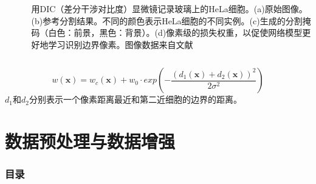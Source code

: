 \documentclass{beamer}%
\begin{document}
\begin{frame}
\begin{columns}
\begin{column}{0.6\linewidth}
\begin{figure}
                \label{fig:fastdata}
            \end{figure}

        \end{column}

        \begin{column}{0.4\linewidth}
            \footnotesize
            用DIC（差分干涉对比度）显微镜记录玻璃上的HeLa细胞。(a)原始图像。(b)参考分割结果。不同的颜色表示HeLa细胞的不同实例。(c)生成的分割掩码（白色：前景，黑色：背景）。(d)像素级的损失权重，以促使网络模型更好地学习识别边界像素。图像数据来自文献\citet{Unet2015Olaf}
        \end{column}
    \end{columns}


    {\setlength\abovedisplayskip{0.1cm}
    \setlength\belowdisplayskip{0.1cm}
    \begin{equation}\label{equ:weights}
        w(\mathbf{x}) = w_c(\mathbf{x}) + w_0 \cdot exp(-\frac{ (d_1 (\mathbf{x}) + d_2(\mathbf{x}) )^2  }{2\sigma^2})
    \end{equation}
    }
    $d_1$和$d_2$分别表示一个像素距离最近和第二近细胞的边界的距离。


\end{frame}




\section{数据预处理与数据增强}
\begin{frame}[allowframebreaks]
    \frametitle{\textsc{目录}} \vspace{-0.3cm}
    \begin{spacing}{0.0}
    \end{spacing}   %
\end{frame}
\end{document}
